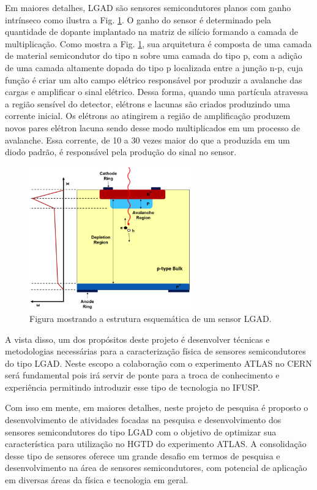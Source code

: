 Em maiores detalhes, LGAD são sensores semicondutores planos com ganho intrínseco como ilustra a Fig. \ref{lgad}. O ganho do sensor é determinado pela quantidade de dopante implantado na matriz de silício formando a camada de multiplicação. Como mostra a Fig. \ref{lgad}, sua arquitetura é composta de uma camada de material semicondutor do tipo n sobre uma camada do tipo p, com a adição de uma camada altamente dopada do tipo p localizada entre a junção n-p, cuja função é criar um alto campo elétrico responsável por produzir a avalanche das cargas e amplificar o sinal elétrico. Dessa forma, quando uma partícula atravessa a região sensível do detector, elétrons e lacunas são criados produzindo uma corrente inicial. Os elétrons ao atingirem a região de amplificação produzem novos pares elétron lacuna sendo desse modo multiplicados em um processo de avalanche. Essa corrente, de 10 a 30 vezes maior do que a produzida em um diodo padrão, é responsável pela produção do sinal no sensor. 

\begin{figure}
    \centering
    \includegraphics[width=7.0cm]{assets/lgad.png}
    \caption{Figura mostrando a estrutura esquemática de um sensor LGAD.}
    \label{lgad}
\end{figure}

A vista disso, um dos propósitos deste projeto é desenvolver técnicas e metodologias necessárias para a caracterização física de sensores semicondutores do tipo LGAD. Neste escopo a colaboração com o experimento ATLAS no CERN será fundamental pois irá servir de ponte para a troca de conhecimento e experiência permitindo introduzir esse tipo de tecnologia no IFUSP.


Com isso em mente, em maiores detalhes, neste projeto de pesquisa é proposto o desenvolvimento de atividades focadas na pesquisa e desenvolvimento dos sensores semicondutores do tipo LGAD com o objetivo de optimizar sua característica para utilização no HGTD do experimento ATLAS. A consolidação desse tipo de sensores oferece um grande desafio em termos de pesquisa e desenvolvimento na área de sensores semicondutores, com potencial de aplicação em diversas áreas da física e tecnologia em geral. 

